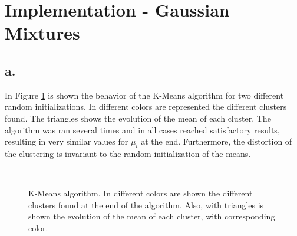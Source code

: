 \documentclass[12pt]{article}
\begin{document}
\section*{Implementation - Gaussian Mixtures}
\subsection*{a.}
In Figure \ref{fig:3a_km} is shown the behavior of the K-Means algorithm for two different random initializations. In different colors are represented the different clusters found. The triangles shows the evolution of the mean of each cluster. The algorithm was ran several times and in all cases reached satisfactory results, resulting in very similar values for $\mu_i$ at the end. Furthermore, the distortion of the clustering is invariant to the random initialization of the means.
\begin{figure} [h!]
\centering
   \\
  \caption{K-Means algorithm. In different colors are shown the different clusters found at the end of the algorithm. Also, with triangles is shown the evolution of the mean of each cluster, with corresponding color.} 
  \label{fig:3a_km}
\end{figure}
\end{document}
